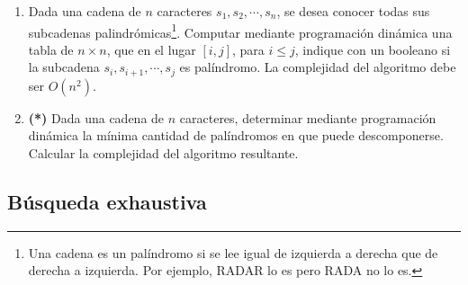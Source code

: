\documentclass{article}
\begin{document}
\begin{enumerate}[resume]
        \item Dada una cadena de $n$ caracteres $s_1,s_2,\cdots, s_n$, se desea conocer todas sus subcadenas palindrómicas\footnote{Una cadena es un palíndromo si se lee igual de izquierda a derecha que de derecha a izquierda. Por ejemplo, RADAR lo es pero RADA no lo es.}.
        Computar mediante programación dinámica una tabla de $n \times n$, que en el lugar $[i,j]$, para $i \leq j$, indique con un booleano si la subcadena $s_i, s_{i+1}, \cdots, s_{j}$ es palíndromo. La complejidad del algoritmo debe ser $O(n^2)$. %
        \item \textbf{(*)} Dada una cadena de $n$ caracteres, determinar mediante programación dinámica la mínima cantidad de palíndromos en que puede descomponerse. Calcular la complejidad del algoritmo resultante.
    \end{enumerate}        

\subsection*{Búsqueda exhaustiva}
\end{document}
